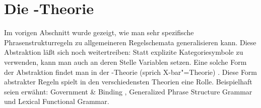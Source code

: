 



\section{Die \xbar-Theorie}
\label{sec-xbar}

Im vorigen Abschnitt wurde gezeigt, wie man sehr spezifische Phrasenstrukturregeln
zu allgemeineren Regelschemata generalisieren kann. Diese Abstraktion läßt sich
noch weitertreiben: Statt explizite Kategoriesymbole zu verwenden, kann man auch
an deren Stelle Variablen setzen. Eine solche Form der Abstraktion findet man in
der \xbar-Theorie (sprich X-bar"=Theorie) \citep{Chomsky70a,Jackendoff77}. Diese Form abstrakter Regeln
spielt in den verschiedensten Theorien eine Rolle. Beispielhaft seien
erwähnt: Government \& Binding \indexgb \citep{Chomsky81a,SS88a,Grewendorf88a},
Generalized Phrase Structure Grammar\indexgpsg \citep*{GKPS85a}
und Lexical Functional Grammar\indexlfg \citep{Bresnan82a-ed,Bresnan2001a,BF96a-ed}.

